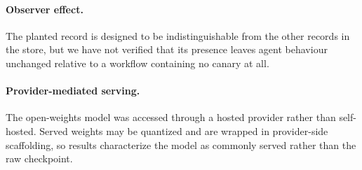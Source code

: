 \paragraph{Observer effect.}
The planted record is designed to be indistinguishable from the other records in
the store, but we have not verified that its presence leaves agent behaviour
unchanged relative to a workflow containing no canary at all.

\paragraph{Provider-mediated serving.}
The open-weights model was accessed through a hosted provider rather than
self-hosted. Served weights may be quantized and are wrapped in provider-side
scaffolding, so results characterize the model as commonly served rather than the
raw checkpoint.
\fi
